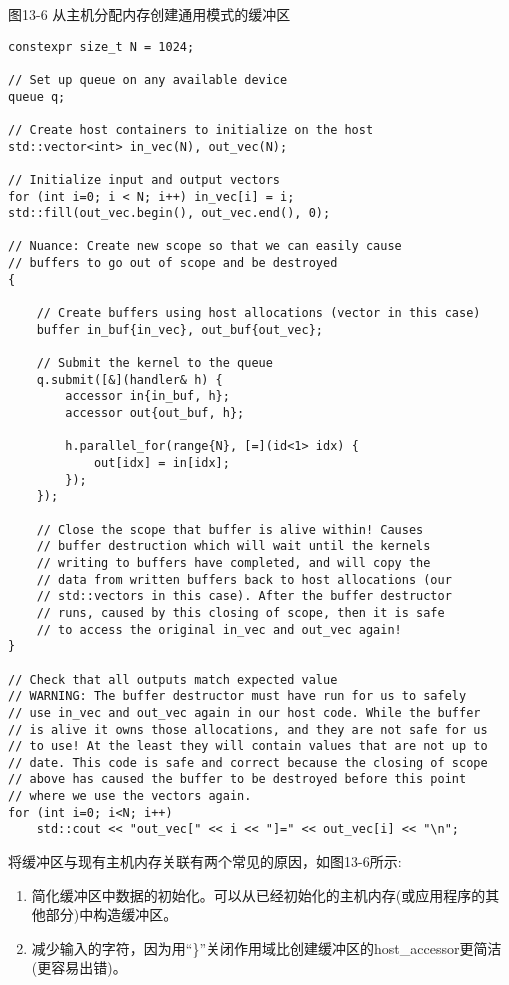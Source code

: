 \hspace*{\fill} \par %
图13-6 从主机分配内存创建通用模式的缓冲区
\begin{lstlisting}[caption={}]
constexpr size_t N = 1024;

// Set up queue on any available device
queue q;

// Create host containers to initialize on the host
std::vector<int> in_vec(N), out_vec(N);

// Initialize input and output vectors
for (int i=0; i < N; i++) in_vec[i] = i;
std::fill(out_vec.begin(), out_vec.end(), 0);

// Nuance: Create new scope so that we can easily cause
// buffers to go out of scope and be destroyed
{
	
	// Create buffers using host allocations (vector in this case)
	buffer in_buf{in_vec}, out_buf{out_vec};
	
	// Submit the kernel to the queue
	q.submit([&](handler& h) {
		accessor in{in_buf, h};
		accessor out{out_buf, h};
		
		h.parallel_for(range{N}, [=](id<1> idx) {
			out[idx] = in[idx];
		});
	});

	// Close the scope that buffer is alive within! Causes
	// buffer destruction which will wait until the kernels
	// writing to buffers have completed, and will copy the
	// data from written buffers back to host allocations (our
	// std::vectors in this case). After the buffer destructor
	// runs, caused by this closing of scope, then it is safe
	// to access the original in_vec and out_vec again!
}

// Check that all outputs match expected value
// WARNING: The buffer destructor must have run for us to safely
// use in_vec and out_vec again in our host code. While the buffer
// is alive it owns those allocations, and they are not safe for us
// to use! At the least they will contain values that are not up to
// date. This code is safe and correct because the closing of scope
// above has caused the buffer to be destroyed before this point
// where we use the vectors again.
for (int i=0; i<N; i++) 
	std::cout << "out_vec[" << i << "]=" << out_vec[i] << "\n";
\end{lstlisting}

将缓冲区与现有主机内存关联有两个常见的原因，如图13-6所示:\par

\begin{enumerate}
	\item 简化缓冲区中数据的初始化。可以从已经初始化的主机内存(或应用程序的其他部分)中构造缓冲区。
	\item 减少输入的字符，因为用“\}”关闭作用域比创建缓冲区的host\_accessor更简洁(更容易出错)。
\end{enumerate}

